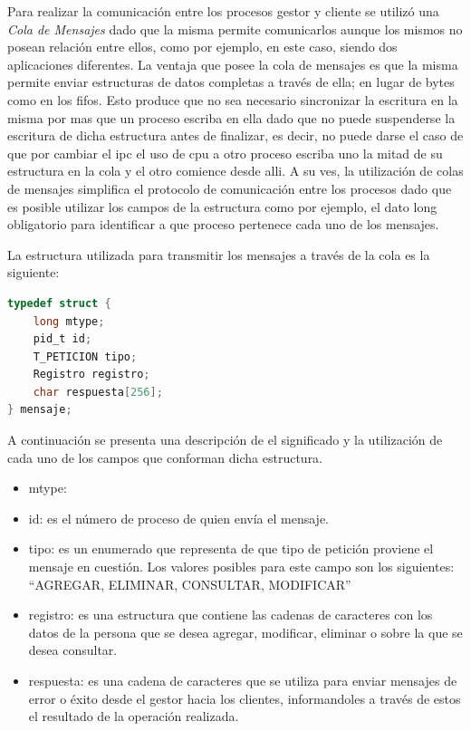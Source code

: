 \documentclass[11pt]{article}
\begin{document}
Para realizar la comunicaci\'on entre los procesos gestor y cliente se utiliz\'o una \textit{Cola de Mensajes} dado que la misma permite comunicarlos 
aunque los mismos no posean relaci\'on entre ellos, como por ejemplo, en este caso, siendo dos aplicaciones diferentes. La ventaja que posee la 
cola de mensajes es que la misma permite enviar estructuras de datos completas a trav\'es de ella; en lugar de bytes como en los fifos.
Esto produce que no sea necesario sincronizar la escritura en la misma por mas que un proceso escriba en ella dado que no puede suspenderse la escritura 
de dicha estructura antes de finalizar, es decir, no puede darse el caso de que por cambiar el ipc el uso de cpu a otro proceso escriba uno la mitad de su estructura 
en la cola y el otro comience desde alli.
A su ves, la utilizaci\'on de colas de mensajes simplifica el protocolo de comunicaci\'on entre los procesos dado que es posible utilizar los campos de la estructura 
como por ejemplo, el dato long obligatorio para identificar a que proceso pertenece cada uno de los mensajes.

La estructura utilizada para transmitir los mensajes a trav\'es de la cola es la siguiente:

\begin{lstlisting}[language=C]
 typedef struct {
	long mtype;
	pid_t id;
	T_PETICION tipo;
	Registro registro;
	char respuesta[256];
} mensaje;
\end{lstlisting}

A continuaci\'on se presenta una descripci\'on de el significado y la utilizaci\'on de cada uno de los campos que conforman dicha estructura.
\begin{itemize}
 \item mtype:
\item id: es el n\'umero de proceso de quien env\'ia el mensaje.
\item tipo: es un enumerado que representa de que tipo de petici\'on proviene el mensaje en cuesti\'on. 
Los valores posibles para este campo son los siguientes: ``AGREGAR, ELIMINAR, CONSULTAR, MODIFICAR''
\item registro: es una estructura que contiene las cadenas de caracteres con los datos de la persona que se desea agregar, modificar, eliminar o sobre la que 
se desea consultar.
\item respuesta: es una cadena de caracteres que se utiliza para enviar mensajes de error o \'exito desde el gestor hacia los clientes, informandoles a 
trav\'es de estos el resultado de la operaci\'on realizada.
\end{itemize}
\end{document}
